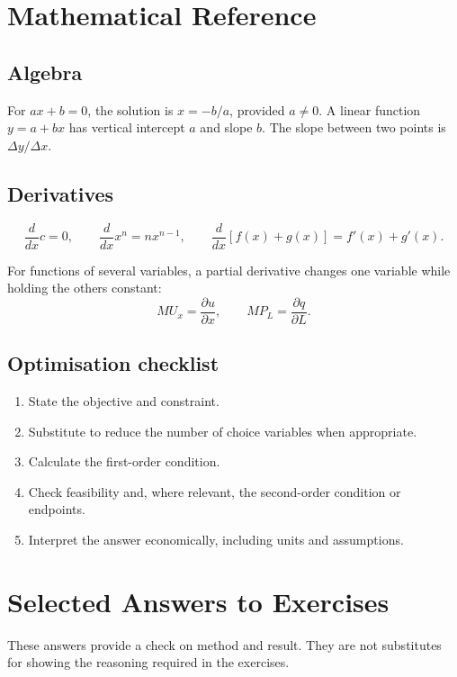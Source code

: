 \chapter{Mathematical Reference}
\label{app:math-reference}

\section{Algebra}

For $ax+b=0$, the solution is $x=-b/a$, provided $a\neq0$. A linear function $y=a+bx$ has vertical intercept $a$ and slope $b$. The slope between two points is $\Delta y/\Delta x$.

\section{Derivatives}

\[
\frac{d}{dx}c=0,\qquad
\frac{d}{dx}x^n=nx^{n-1},\qquad
\frac{d}{dx}[f(x)+g(x)]=f'(x)+g'(x).
\]

For functions of several variables, a partial derivative changes one variable while holding the others constant:
\[
MU_x=\frac{\partial u}{\partial x},
\qquad
MP_L=\frac{\partial q}{\partial L}.
\]

\section{Optimisation checklist}

\begin{enumerate}
  \item State the objective and constraint.
  \item Substitute to reduce the number of choice variables when appropriate.
  \item Calculate the first-order condition.
  \item Check feasibility and, where relevant, the second-order condition or endpoints.
  \item Interpret the answer economically, including units and assumptions.
\end{enumerate}

\chapter{Selected Answers to Exercises}
\label{app:answers}

These answers provide a check on method and result. They are not substitutes for showing the reasoning required in the exercises.

